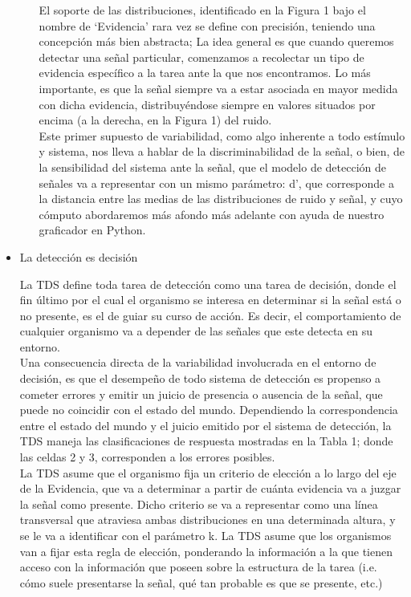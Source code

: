 \begin{itemize}
\begin{itemize}
El soporte de las distribuciones, identificado en la Figura 1 bajo el nombre de ‘Evidencia’ rara vez se define con precisión,  teniendo una concepción más bien abstracta; La idea general es que cuando queremos detectar una señal particular, comenzamos a recolectar un tipo de evidencia específico a la tarea ante la que nos encontramos. Lo más importante, es que la señal siempre va a estar asociada en mayor medida con dicha evidencia, distribuyéndose siempre en valores situados por encima (a la derecha, en la Figura 1) del ruido.\\


Este primer supuesto de variabilidad, como algo inherente a todo estímulo y sistema, nos lleva a hablar de la discriminabilidad de la señal, o bien, de la sensibilidad del sistema ante la señal, que el modelo de detección de señales va a representar con un mismo parámetro: d’, que corresponde a la distancia entre las medias de las distribuciones de ruido y señal, y cuyo cómputo abordaremos más afondo más adelante con ayuda de nuestro graficador en Python.\\ 

     \end{itemize}
  \item{La detección es decisión}

La TDS define toda tarea de detección como una tarea de decisión, donde el fin último por el cual el organismo se interesa en determinar si la señal está o no presente, es el de guiar su curso de acción. Es decir, el comportamiento de cualquier organismo va a depender de las señales que este detecta en su entorno.\\

Una consecuencia directa de la variabilidad involucrada en el entorno de decisión, es que el desempeño de todo sistema de detección es propenso a cometer errores y emitir un juicio de presencia o ausencia de la señal, que puede no coincidir con el estado del mundo. Dependiendo la correspondencia entre el estado del mundo y el juicio emitido por el sistema de detección, la TDS maneja las clasificaciones de respuesta mostradas en la Tabla 1; donde las celdas 2 y 3, corresponden a los errores posibles.\\

La TDS asume que el organismo fija un criterio de elección a lo largo del eje de la Evidencia, que va a determinar a partir de cuánta evidencia va a juzgar la señal como presente. Dicho criterio se va a representar como una línea transversal que atraviesa ambas distribuciones en una determinada altura, y se le va a identificar con el parámetro k. La TDS asume que los organismos van a fijar esta regla de elección, ponderando la información a la que tienen acceso con la información que poseen sobre la estructura de la tarea (i.e. cómo suele presentarse la señal, qué tan probable es que se presente, etc.)\\


\end{itemize}
